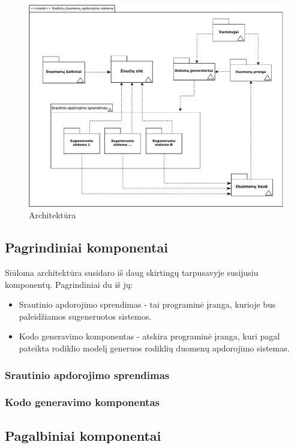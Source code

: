 \documentclass{VUMIFPSbakalaurinis}
\begin{document}
\begin{figure}[H]
    \centering
    \includegraphics[width=1\textwidth]{img/architekturos_diagrama.pdf}
    \caption{Architektūra}
    \label{img:architektura}
\end{figure}

\subsection{Pagrindiniai komponentai}
Siūloma architektūra susidaro iš daug skirtingų tarpusavyje susijusiu komponentų. Pagrindiniai du iš jų:
\begin{itemize}
    \item Srautinio apdorojimo sprendimas - tai programinė įranga, kurioje bus paleidžiamos sugeneruotos sistemos.
    \item Kodo generavimo komponentas - atskira programinė įranga, kuri pagal pateikta rodiklio modelį generuos rodiklių duomenų apdorojimo sistemas.
\end{itemize}

\subsubsection{Srautinio apdorojimo sprendimas}

\subsubsection{Kodo generavimo komponentas}

\subsection{Pagalbiniai komponentai}
\end{document}
